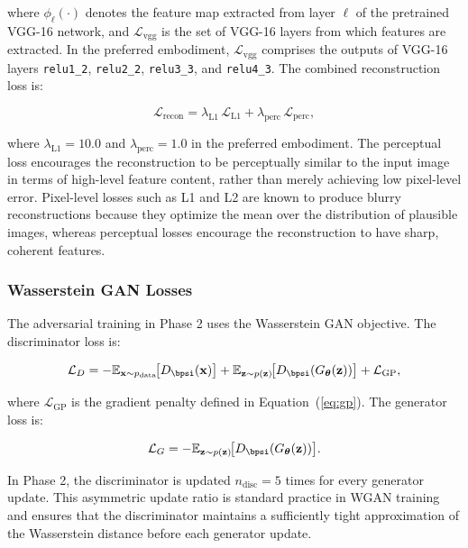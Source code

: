 \documentclass[12pt,letterpaper]{article}
\newcommand{\bz}{\mathbf{z}}
\newcommand{\bx}{\mathbf{x}}
\newcommand{\btheta}{\bm{\theta}}
\newcommand{\EE}{\mathbb{E}}
\begin{document}
\noindent where $\phi_\ell(\cdot)$ denotes the feature map extracted from layer
$\ell$ of the pretrained VGG-16 network, and $\mathcal{L}_{\text{vgg}}$ is the
set of VGG-16 layers from which features are extracted. In the preferred
embodiment, $\mathcal{L}_{\text{vgg}}$ comprises the outputs of VGG-16 layers
\texttt{relu1\_2}, \texttt{relu2\_2}, \texttt{relu3\_3}, and \texttt{relu4\_3}.
The combined reconstruction loss is:

\begin{equation}
  \mathcal{L}_{\text{recon}} = \lambda_{\text{L1}}\,\mathcal{L}_{\text{L1}}
    + \lambda_{\text{perc}}\,\mathcal{L}_{\text{perc}},
  \label{eq:recon}
\end{equation}

\noindent where $\lambda_{\text{L1}} = 10.0$ and $\lambda_{\text{perc}} = 1.0$
in the preferred embodiment. The perceptual loss encourages the reconstruction
to be perceptually similar to the input image in terms of high-level feature
content, rather than merely achieving low pixel-level error. Pixel-level losses
such as L1 and L2 are known to produce blurry reconstructions because they
optimize the mean over the distribution of plausible images, whereas perceptual
losses encourage the reconstruction to have sharp, coherent features.

\subsubsection{Wasserstein GAN Losses}

The adversarial training in Phase 2 uses the Wasserstein GAN objective. The
discriminator loss is:

\begin{equation}
  \mathcal{L}_D = -\EE_{\bx \sim p_{\text{data}}}\!\bigl[D_{\bpsi}(\bx)\bigr]
    + \EE_{\bz \sim p(\bz)}\!\bigl[D_{\bpsi}(G_{\btheta}(\bz))\bigr]
    + \mathcal{L}_{\text{GP}},
  \label{eq:disc}
\end{equation}

\noindent where $\mathcal{L}_{\text{GP}}$ is the gradient penalty defined in
Equation~(\ref{eq:gp}). The generator loss is:

\begin{equation}
  \mathcal{L}_G = -\EE_{\bz \sim p(\bz)}\!\bigl[D_{\bpsi}(G_{\btheta}(\bz))\bigr].
  \label{eq:gen}
\end{equation}

In Phase 2, the discriminator is updated $n_{\text{disc}} = 5$ times for every
generator update. This asymmetric update ratio is standard practice in WGAN
training and ensures that the discriminator maintains a sufficiently tight
approximation of the Wasserstein distance before each generator update.
\end{document}

